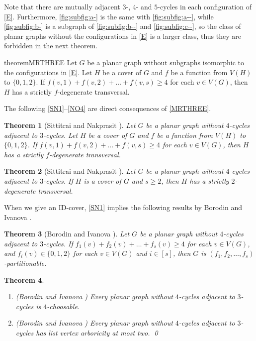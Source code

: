 \documentclass{article}
\newtheorem{theorem}{Theorem}[section]
\theoremstyle{definition}
\begin{document}
Note that there are mutually adjacent $3$-, $4$- and $5$-cycles in each configuration of \autoref{E}. Furthermore, \autoref{fig:subfig:a-} is the same with \autoref{fig:subfig:a--}, while \autoref{fig:subfig:b-} is a subgraph of \autoref{fig:subfig:b--} and \autoref{fig:subfig:c--}, so the class of planar graphs without the configurations in \autoref{E} is a larger class, thus they are forbidden in the next theorem. 
\begin{restatable}{theorem}{MRTHREE}\label{MRTHREE}
Let $G$ be a planar graph without subgraphs isomorphic to the configurations in \autoref{E}. Let $H$ be a cover of $G$ and $f$ be a function from $V(H)$ to $\{0, 1, 2\}$. If $f(v, 1) + f(v, 2) + \dots + f(v, s) \geq 4$ for each $v \in V(G)$, then $H$ has a strictly $f$-degenerate transversal. 
\end{restatable}

The following \autoref{SN1}--\ref{NO4} are direct consequences of \autoref{MRTHREE}. 
\begin{theorem}[Sittitrai and Nakprasit \cite{MR4345150}]\label{SN1}
Let $G$ be a planar graph without $4$-cycles adjacent to $3$-cycles. Let $H$ be a cover of $G$ and $f$ be a function from $V(H)$ to $\{0, 1, 2\}$. If $f(v, 1) + f(v, 2) + \dots + f(v, s) \geq 4$ for each $v \in V(G)$, then $H$ has a strictly $f$-degenerate transversal. 
\end{theorem}

\begin{theorem}[Sittitrai and Nakprasit \cite{MR4345150}]\label{SN2}
Let $G$ be a planar graph without $4$-cycles adjacent to $3$-cycles. If $H$ is a cover of $G$ and $s \geq 2$, then $H$ has a strictly $2$-degenerate transversal. 
\end{theorem}

When we give an ID-cover, \autoref{SN1} implies the following results by Borodin and Ivanova \cite{MR2566928}. 
\begin{theorem}[Borodin and Ivanova \cite{MR2566928}]
Let $G$ be a planar graph without $4$-cycles adjacent to $3$-cycles. If $f_{1}(v) + f_{2}(v) + \dots + f_{s}(v)  \geq 4$ for each $v \in V(G)$, and $f_{i}(v) \in \{0, 1, 2\}$ for each $v \in V(G)$ and $i \in [s]$, then $G$ is $(f_{1}, f_{2}, \dots, f_{s})$-partitionable. 
\end{theorem}

\begin{theorem}
\text{}
\begin{enumerate}[label = (\roman*)]
\item (Borodin and Ivanova \cite{MR2586624}) Every planar graph without $4$-cycles adjacent to $3$-cycles is $4$-choosable. 
\item (Borodin and Ivanova \cite{MR2566928}) Every planar graph without $4$-cycles adjacent to $3$-cycles has list vertex arboricity at most two. \qed
\end{enumerate}
\end{theorem}
\end{document}

